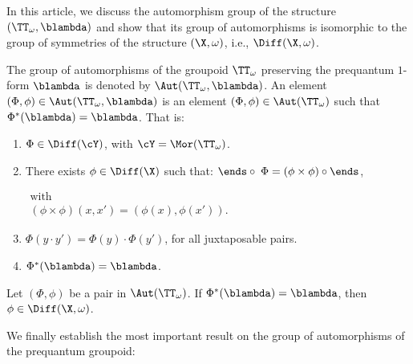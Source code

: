   \begin{article}
    \label{art: The Automorphism Group}
    
    In this article,
    we discuss the automorphism group of the structure $(\TT_\omega,\blambda)$ and show that its group of automorphisms is isomorphic to the group of symmetries of the structure $(\X,\omega)$,
    i.e.,
    $\Diff(\X,\omega)$.
    
    The group of automorphisms of the groupoid $\TT_\omega$ preserving the prequantum $1$-form $\blambda$ is denoted by $\Aut(\TT_\omega,\blambda)$.
    An element $(\Phi,\phi) \in \Aut(\TT_\omega,\blambda)$ is an element $(\Phi,\phi) \in \Aut(\TT_\omega)$ such that $\Phi^*(\blambda) = \blambda$.
    That is:
    \begin{enumerate}
      \item $\Phi \in \Diff(\cY)$,
      with $\cY = \Mor(\TT_\omega)$.
      \item There exists $\phi \in \Diff(\X)$ such that: $\ends \circ\; \Phi = (\phi \times \phi) \circ \ends$,
      
      \quad
      $\begin{array}{c}
      \text{with} \\
      (\phi \times \phi)(x,x') = (\phi(x),\phi(x')).
      \end{array}$
      
      \item $\Phi(y \cdot y') = \Phi(y) \cdot \Phi(y')$,
      for all juxtaposable pairs.
      \item $\Phi^*(\blambda) = \blambda$.
    \end{enumerate}
    
    \begin{proposition}{}
      Let $(\Phi,\phi)$ be a pair in $\Aut(\TT_\omega)$.
      If $\Phi^*(\blambda) = \blambda$,
      then $\phi \in \Diff(\X,\omega)$.
    \end{proposition}
    
    We finally establish the most important result on the group of automorphisms of the prequantum groupoid:
    

\end{article}
